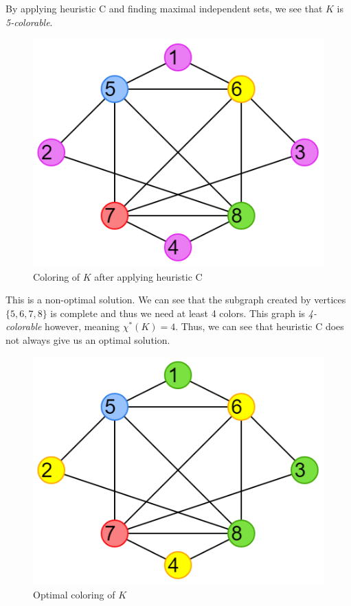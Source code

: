 \documentclass{article}
\theoremstyle{definition}
\begin{document}
By applying heuristic C and finding maximal independent sets, we see that \(K\) is \emph{5-colorable}.

\begin{figure}[H]
\centering
\includegraphics[scale=0.38]{images/mis-2.png}
\caption{Coloring of \(K\) after applying heuristic C}
\end{figure}

This is a non-optimal solution. We can see that the subgraph created by vertices \(\{5, 6, 7, 8\}\) is complete and thus we need at least 4 colors. This graph is \emph{4-colorable} however, meaning \(\chi^{*}(K) = 4\). Thus, we can see that heuristic C does not always give us an optimal solution.

\begin{figure}[H]
\centering
\includegraphics[scale=0.38]{images/mis-3.png}
\caption{Optimal coloring of \(K\)}
\end{figure}
\end{document}
